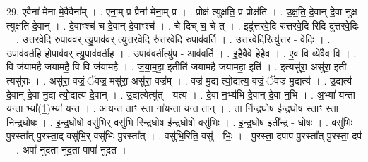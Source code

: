 \documentclass[17pt]{extarticle}
\begin{document}
29. ए॒वैना॑ मेना मे॒वैवैना᳚म् । . ए॒ना॒म् प्र प्रैना॑ मेना॒म् प्र । . प्रोक्ष॑ त्युक्षति॒ प्र प्रोक्ष॑ति । . उ॒क्ष॒ति॒ दे॒वान् दे॒वा नु॑क्ष त्युक्षति दे॒वान् । . दे॒वाꣳश्च॑ च दे॒वान् दे॒वाꣳश्च॑ । . चे दिच् च॒ चे त् । . इदु॑त्तरवे॒दि रु॑त्तरवे॒दि रिदि दु॑त्तरवे॒दिः । . उ॒त्त॒र॒वे॒दि रु॒पाव॑वर् त्यु॒पाव॑वर् त्युत्तरवे॒दि रु॑त्तरवे॒दि रु॒पाव॑वर्ति । . उ॒त्त॒र॒वे॒दिरित्यु॑त्तर - वे॒दिः । . उ॒पाव॑वर्ती॒हे होपाव॑वर् त्यु॒पाव॑वर्ती॒ह । . उ॒पाव॑व॒र्तीत्यु॑प - आव॑वर्ति । . इ॒हैवैवे हेहैव । . ए॒व वि व्ये॑वैव वि । . वि ज॑यामहै जयामहै॒ वि वि ज॑यामहै । . ज॒या॒म॒हा॒ इतीति॑ जयामहै जयामहा॒ इति॑ । . इत्यसु॑रा॒ असु॑रा॒ इती त्यसु॑राः । . असु॑रा॒ वज्रं॒ ॅवज्र॒ मसु॑रा॒ असु॑रा॒ वज्र᳚म् । . वज्र॑ मु॒द्य त्यो॒द्यत्य॒ वज्रं॒ ॅवज्र॑ मु॒द्यत्य॑ । . उ॒द्यत्य॑ दे॒वान् दे॒वा नु॒द्य त्यो॒द्यत्य॑ दे॒वान् । . उ॒द्यत्येत्यु॑त् - यत्य॑ । . दे॒वा न॒भ्य॑भि दे॒वान् दे॒वा न॒भि । . अ॒भ्या॑ यन्ता यन्ता॒ भ्या᳚(1॒)भ्या॑ यन्त । . आ॒य॒न्त॒ ताꣳ स्ता ना॑यन्ता यन्त॒ तान् । . ता नि॑न्द्रघो॒ष इ॑न्द्रघो॒ष स्ताꣳ स्ता नि॑न्द्रघो॒षः । . इ॒न्द्र॒घो॒षो वसु॑भि॒र् वसु॑भि रिन्द्रघो॒ष इ॑न्द्रघो॒षो वसु॑भिः । . इ॒न्द्र॒घो॒ष इती᳚न्द्र - घो॒षः । . वसु॑भिः पु॒रस्ता᳚त् पु॒रस्ता॒द् वसु॑भि॒र् वसु॑भिः पु॒रस्ता᳚त् । . वसु॑भि॒रिति॒ वसु॑ - भिः॒ । . पु॒रस्ता॒ दपाप॑ पु॒रस्ता᳚त् पु॒रस्ता॒ दप॑ । . अपा॑ नुदता नुद॒ता पापा॑ नुदत । \newline
\end{document}
